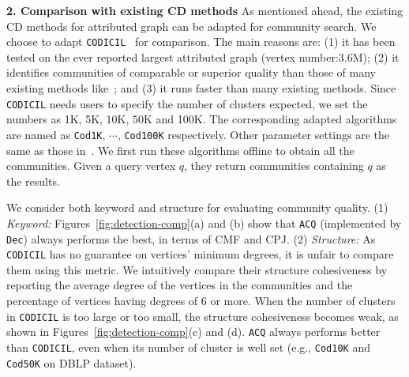 {\bf 2. Comparison with existing CD methods}
As mentioned ahead, the existing CD methods for attributed graph can be adapted for community search. We choose to adapt {\tt CODICIL}~\cite{attr-www2013} for comparison. The main reasons are: (1) it has been tested on the ever reported largest attributed graph (vertex number:3.6M); (2) it identifies communities of comparable or superior quality than those of many existing methods like~\cite{attr-topic-kdd2008,attr-kdd2009}; and (3) it runs faster than many existing methods. Since {\tt CODICIL} needs users to specify the number of clusters expected, we set the numbers as 1K, 5K, 10K, 50K and 100K. The corresponding adapted algorithms are named as {\tt Cod1K}, $\cdots$, {\tt Cod100K} respectively. Other parameter settings are the same as those in~\cite{attr-www2013}. We first run these algorithms offline to obtain all the communities. Given a query vertex $q$, they return communities containing $q$ as the results.

We consider both keyword and structure for evaluating community quality.
(1) \emph{Keyword:} Figures~\ref{fig:detection-comp}(a) and (b) show that {\tt ACQ} (implemented by {\tt Dec}) always performs the best, in terms of CMF and CPJ.
(2) \emph{Structure:} As {\tt CODICIL} has no guarantee on vertices' minimum degrees, it is unfair to compare them using this metric. We intuitively compare their structure cohesiveness by reporting the average degree of the vertices in the communities and the percentage of vertices having degrees of 6 or more. When the number of clusters in {\tt CODICIL} is too large or too small, the structure cohesiveness becomes weak, as shown in Figures~\ref{fig:detection-comp}(c) and (d). {\tt ACQ} always performs better than {\tt CODICIL}, even when its number of cluster is well set (e.g., {\tt Cod10K} and {\tt Cod50K} on DBLP dataset).

